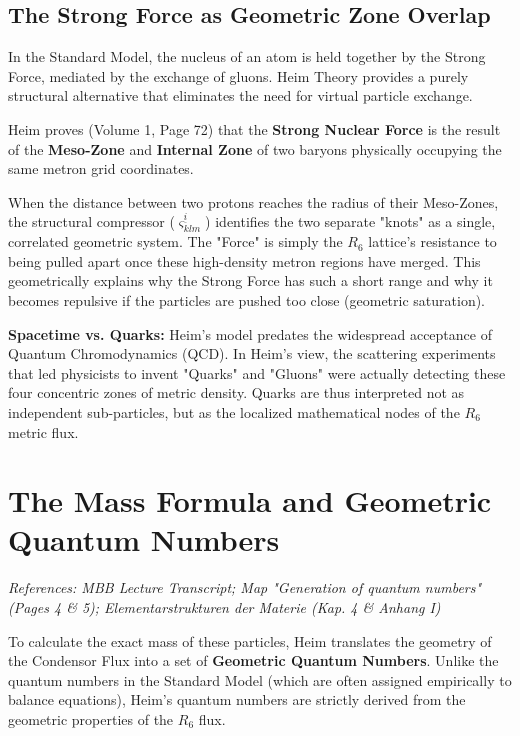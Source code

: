 \documentclass[11pt,a4paper,oneside]{article}
\begin{document}
\subsection{The Strong Force as Geometric Zone Overlap}
In the Standard Model, the nucleus of an atom is held together by the Strong Force, mediated by the exchange of gluons. Heim Theory provides a purely structural alternative that eliminates the need for virtual particle exchange.

Heim proves (Volume 1, Page 72) that the \textbf{Strong Nuclear Force} is the result of the \textbf{Meso-Zone} and \textbf{Internal Zone} of two baryons physically occupying the same metron grid coordinates. 

When the distance between two protons reaches the radius of their Meso-Zones, the structural compressor ($\varsigma^{\underline{i}}_{klm}$) identifies the two separate "knots" as a single, correlated geometric system. The "Force" is simply the $R_6$ lattice's resistance to being pulled apart once these high-density metron regions have merged. This geometrically explains why the Strong Force has such a short range and why it becomes repulsive if the particles are pushed too close (geometric saturation).

\begin{mbbcite}
    \textbf{Spacetime vs. Quarks:} Heim's model predates the widespread acceptance of Quantum Chromodynamics (QCD). In Heim's view, the scattering experiments that led physicists to invent "Quarks" and "Gluons" were actually detecting these four concentric zones of metric density. Quarks are thus interpreted not as independent sub-particles, but as the localized mathematical nodes of the $R_6$ metric flux.
\end{mbbcite} 
\section{The Mass Formula and Geometric Quantum Numbers}
\label{sec:mass_formula}

\textit{References: MBB Lecture Transcript; Map "Generation of quantum numbers" (Pages 4 \& 5); Elementarstrukturen der Materie (Kap. 4 \& Anhang I)}

To calculate the exact mass of these particles, Heim translates the geometry of the Condensor Flux into a set of \textbf{Geometric Quantum Numbers}. Unlike the quantum numbers in the Standard Model (which are often assigned empirically to balance equations), Heim's quantum numbers are strictly derived from the geometric properties of the $R_6$ flux.
\end{document}
